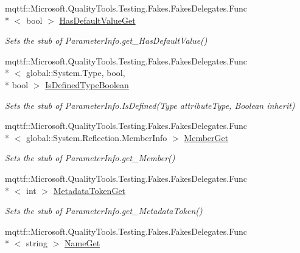 \begin{DoxyCompactItemize}
mqttf\-::\-Microsoft.\-Quality\-Tools.\-Testing.\-Fakes.\-Fakes\-Delegates.\-Func\\*
$<$ bool $>$ \hyperlink{class_system_1_1_reflection_1_1_fakes_1_1_stub_parameter_info_a2ebc17c31e84d0f9c932a405054bca3a}{Has\-Default\-Value\-Get}
\begin{DoxyCompactList}\small\item\em Sets the stub of Parameter\-Info.\-get\-\_\-\-Has\-Default\-Value()\end{DoxyCompactList}\item 
mqttf\-::\-Microsoft.\-Quality\-Tools.\-Testing.\-Fakes.\-Fakes\-Delegates.\-Func\\*
$<$ global\-::\-System.\-Type, bool, \\*
bool $>$ \hyperlink{class_system_1_1_reflection_1_1_fakes_1_1_stub_parameter_info_af3718702fc6351abc57e2a1a31c969d1}{Is\-Defined\-Type\-Boolean}
\begin{DoxyCompactList}\small\item\em Sets the stub of Parameter\-Info.\-Is\-Defined(\-Type attribute\-Type, Boolean inherit)\end{DoxyCompactList}\item 
mqttf\-::\-Microsoft.\-Quality\-Tools.\-Testing.\-Fakes.\-Fakes\-Delegates.\-Func\\*
$<$ global\-::\-System.\-Reflection.\-Member\-Info $>$ \hyperlink{class_system_1_1_reflection_1_1_fakes_1_1_stub_parameter_info_adcf5003a71e44970f04a98ab3a69ad4d}{Member\-Get}
\begin{DoxyCompactList}\small\item\em Sets the stub of Parameter\-Info.\-get\-\_\-\-Member()\end{DoxyCompactList}\item 
mqttf\-::\-Microsoft.\-Quality\-Tools.\-Testing.\-Fakes.\-Fakes\-Delegates.\-Func\\*
$<$ int $>$ \hyperlink{class_system_1_1_reflection_1_1_fakes_1_1_stub_parameter_info_a5acaa463553dfdb8f79954957e48a539}{Metadata\-Token\-Get}
\begin{DoxyCompactList}\small\item\em Sets the stub of Parameter\-Info.\-get\-\_\-\-Metadata\-Token()\end{DoxyCompactList}\item 
mqttf\-::\-Microsoft.\-Quality\-Tools.\-Testing.\-Fakes.\-Fakes\-Delegates.\-Func\\*
$<$ string $>$ \hyperlink{class_system_1_1_reflection_1_1_fakes_1_1_stub_parameter_info_ad962edefdd794a8cfe7fc9c19a42922a}{Name\-Get}

\end{DoxyCompactItemize}
